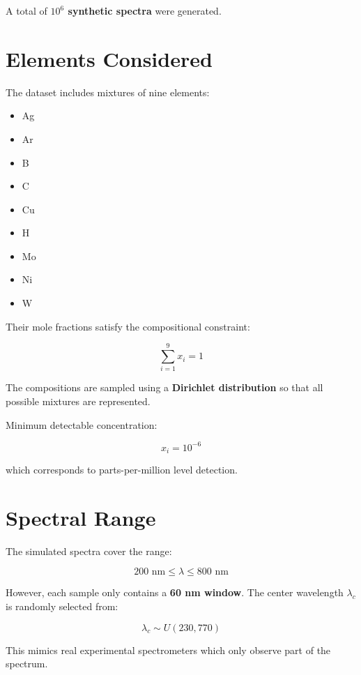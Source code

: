 \documentclass[12pt]{article}
\begin{document}
A total of \textbf{$10^6$ synthetic spectra} were generated.

\section{Elements Considered}
The dataset includes mixtures of nine elements:

\begin{itemize}
\item Ag
\item Ar
\item B
\item C
\item Cu
\item H
\item Mo
\item Ni
\item W
\end{itemize}

Their mole fractions satisfy the compositional constraint:

\begin{equation}
\sum_{i=1}^{9} x_i = 1
\end{equation}

The compositions are sampled using a \textbf{Dirichlet distribution} so that all possible mixtures are represented.

Minimum detectable concentration:

\begin{equation}
x_i = 10^{-6}
\end{equation}

which corresponds to parts-per-million level detection.

\section{Spectral Range}
The simulated spectra cover the range:

\begin{equation}
200 \text{ nm} \leq \lambda \leq 800 \text{ nm}
\end{equation}

However, each sample only contains a \textbf{60 nm window}. The center wavelength $\lambda_c$ is randomly selected from:

\begin{equation}
\lambda_c \sim U(230,770)
\end{equation}

This mimics real experimental spectrometers which only observe part of the spectrum.
\end{document}
